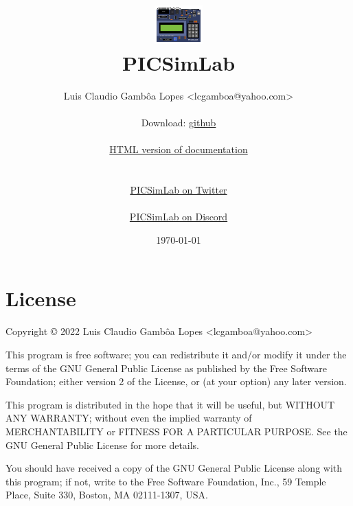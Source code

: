 \documentclass[oneside]{book}
\title{ ~~\\ ~~\\ ~~\\ \includegraphics[scale=1.0]{img/logo.png} \\ PICSimLab \PNversion}
\author{Luis Claudio Gambôa Lopes  <lcgamboa@yahoo.com>\\
\\
{\centering Download: \href{https://github.com/lcgamboa/picsimlab}{github}}
\\
\ifpdf
\\
{\centering \href{https://lcgamboa.github.io/picsimlab\_docs/\PNversion/}{HTML version of documentation}} 
\else
\\
{\centering \hrefb{picsimlab.pdf}{PDF version of documentation}} 
\fi
\\
\\
{\centering \href{https://twitter.com/PICSimLab}{PICSimLab on Twitter}}
\\
\\
{\centering \href{https://discord.gg/fMT8szFYq7}{PICSimLab on Discord}}
}
\date{\today}
\begin{document}
\def\hrefb#1#2{\href{#1}{#2}}
\def\hrefr#1#2{\href{run:#1}{#2}}


\hypersetup{pageanchor=false}
\maketitle
\hypersetup{pageanchor=true}

\ifdefined\HCode\else
\tableofcontents
\fi













\chapter{License}

Copyright © 2022 Luis Claudio Gambôa Lopes <lcgamboa@yahoo.com>

This program is free software; you can redistribute it and/or modify
it under the terms of the GNU General Public License as published by
the Free Software Foundation; either version 2 of the License, or
(at your option) any later version.

This program is distributed in the hope that it will be useful,
but WITHOUT ANY WARRANTY; without even the implied warranty of
MERCHANTABILITY or FITNESS FOR A PARTICULAR PURPOSE. See the
GNU General Public License for more details.

You should have received a copy of the GNU General Public License
along with this program; if not, write to the Free Software
Foundation, Inc., 59 Temple Place, Suite 330,
Boston, MA 02111-1307, USA.

\appendix



\end{document}
